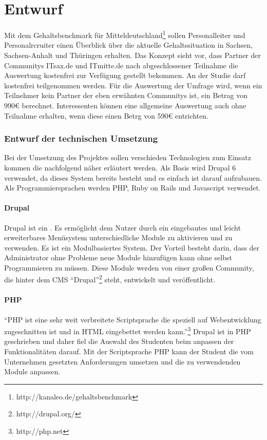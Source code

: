 \part{Entwurf}
Mit dem Gehaltsbenchmark für Mitteldeutschland\footnote{http://kanaleo.de/gehaltsbenchmark} sollen Personalleiter und Personalrcruiter einen Überblick über die aktuelle Gehaltssituation in Sachsen, Sachsen-Anhalt und Thüringen erhalten. 
Das Konzept sieht vor, dass Partner der Communitys ITsax.de und ITmitte.de nach abgeschlossener Teilnahme die Auswertung kostenfrei zur Verfügung gestellt bekommen. An der Studie darf kostenfrei teilgenommen werden. Für die Auswertung der Umfrage wird, wenn ein Teilnehmer kein Partner der eben erwähnten Communitys ist, ein Betrag von 990€ berechnet. 
Interessenten können eine allgemeine Auswertung auch ohne Teilnahme erhalten, wenn diese einen Betrg von 590€ entrichten. 
\section{Entwurf der technischen Umsetzung}
Bei der Umsetzung des Projektes sollen verschieden Technologien zum Einsatz kommen die nachfolgend näher erläutert werden. Als Basis wird Drupal 6 verwendet, da dieses System bereits besteht und es einfach ist darauf aufzubauen.
Als Programmiersprachen werden PHP, Ruby on Rails und Javascript verwendet. 
\subsection{Drupal}
Drupal ist ein . Es ermöglicht dem Nutzer durch ein eingebautes und leicht erweiterbares Menüsystem unterschiedliche Module zu aktivieren und zu verwenden. 
Es ist ein Modulbasiertes System. Der Vorteil besteht darin, dass der Administrator ohne Probleme neue Module hinzufügen kann ohne selbst Programmieren zu müssen. 
Diese Module werden von einer großen Community, die hinter dem CMS ``Drupal''\footnote{http://drupal.org/} steht, entwickelt und veröffentlicht.
\subsection{PHP}
``PHP ist eine sehr weit verbreitete Scriptsprache die speziell auf Webentwicklung zugeschnitten ist und in HTML eingebettet werden kann.''\footnote{http://php.net}
Drupal ist in PHP geschrieben und daher fiel die Auswahl des Studenten beim anpassen der Funktionalitäten darauf. Mit der Scriptsprache PHP kann der Student die vom Unternehmen gesetzten Anforderungen umsetzen und die zu verwendenden Module anpassen.
